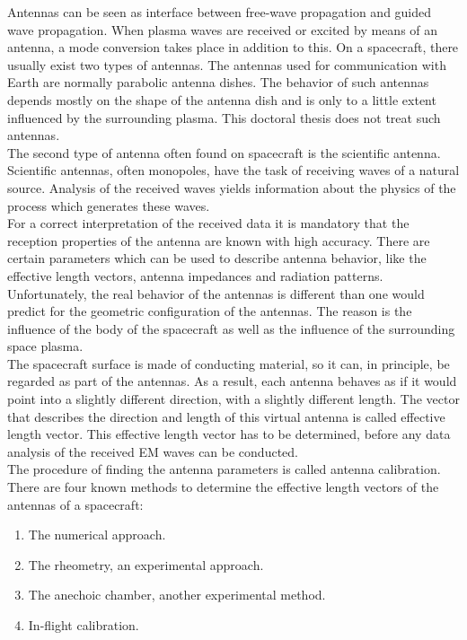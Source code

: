 \documentclass[a4paper,11pt]{thesis}
\begin{document}
Antennas can be seen as interface between free-wave propagation and guided wave propagation. When plasma waves are received or excited by means of an antenna, a mode conversion takes place in addition to this. On a spacecraft, there usually exist two types of antennas. The antennas used for communication with Earth are normally parabolic antenna dishes. The behavior of such antennas depends mostly on the shape of the antenna dish and is only to a little extent influenced by the surrounding plasma. This doctoral thesis does not treat such antennas.\\

The second type of antenna often found on spacecraft is the scientific antenna. Scientific antennas, often monopoles, have the task of receiving waves of a natural source. Analysis of the received waves yields information about the physics of the process which generates  these waves.\\

For a correct interpretation of the received data it is mandatory that the reception properties of the antenna are known with high accuracy. There are certain parameters which can be used to describe antenna behavior, like the effective length vectors, antenna impedances and radiation patterns. Unfortunately, the real behavior of the antennas is different than one would predict for the geometric configuration of the antennas. The reason is the influence of the body of the spacecraft as well as the influence of the surrounding space plasma.\\

The spacecraft surface is made of conducting material, so it can, in principle, be regarded as part of the antennas. As a result, each antenna behaves as if it would point into a slightly different direction, with a slightly different length. The vector that describes the direction and length of this virtual antenna is called effective length vector. This effective length vector has to be determined, before any data analysis of the received EM waves can be conducted.\\

The procedure of finding the antenna parameters is called antenna calibration. There are four known methods to determine the effective length vectors of the antennas of a spacecraft:

\begin{enumerate}
\item The numerical approach.
\item The rheometry, an experimental approach.
\item The anechoic chamber, another experimental method.
\item In-flight calibration.
\end{enumerate}
\end{document}
